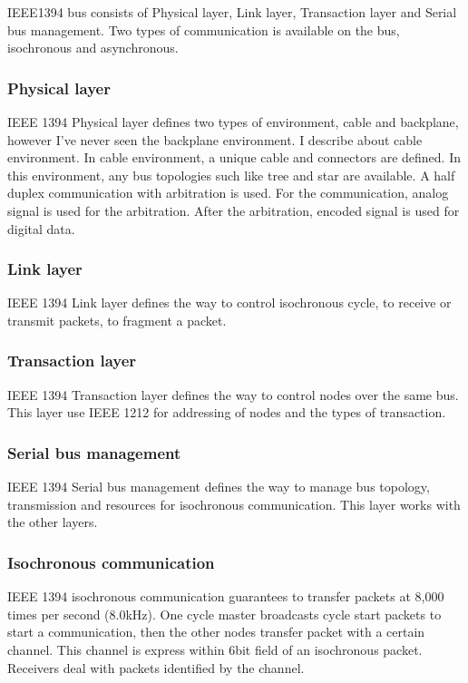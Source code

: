 \documentclass[onecolumn]{article}
\begin{document}
IEEE1394 bus consists of Physical layer, Link layer, Transaction layer and Serial bus management. Two types of communication is available on the bus, isochronous and asynchronous.

\subsubsection{Physical layer}
IEEE 1394 Physical layer defines two types of environment, cable and backplane, however I've never seen the backplane environment. I describe about cable environment. In cable environment, a unique cable and connectors are defined. In this environment, any bus topologies such like tree and star are available. A half duplex communication with arbitration is used. For the communication, analog signal is used for the arbitration. After the arbitration, encoded signal is used for digital data.


\subsubsection{Link layer}
IEEE 1394 Link layer defines the way to control isochronous cycle, to receive or transmit packets, to fragment a packet.


\subsubsection{Transaction layer}
IEEE 1394 Transaction layer defines the way to control nodes over the same bus. This layer use IEEE 1212 for addressing of nodes and the types of transaction.

\subsubsection{Serial bus management}
IEEE 1394 Serial bus management defines the way to manage bus topology, transmission and resources for isochronous communication. This layer works with the other layers.

\subsubsection{Isochronous communication}
IEEE 1394 isochronous communication guarantees to transfer packets at 8,000 times per second (8.0kHz). One cycle master broadcasts cycle start packets to start a communication, then the other nodes transfer packet with a certain channel. This channel is express within 6bit field of an isochronous packet. Receivers deal with packets identified by the channel.
\end{document}
